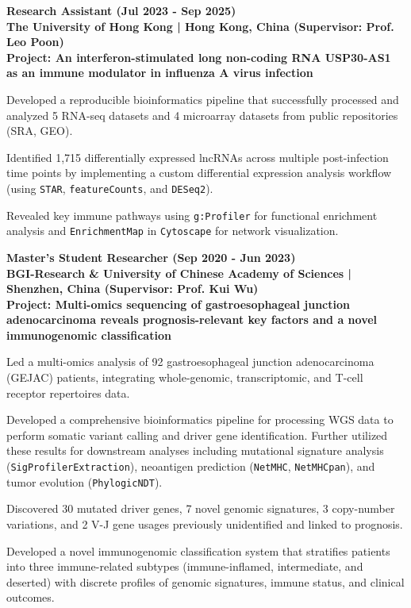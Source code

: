 \documentclass[11pt, a4paper]{awesome-cv}
\begin{document}
\begin{cvparagraph}
\textbf{Research Assistant (Jul 2023 - Sep 2025)}\\
\textbf{The University of Hong Kong | Hong Kong, China (Supervisor: Prof. Leo Poon)}\\
\textbf{Project: An interferon-stimulated long non-coding RNA USP30-AS1 as an immune modulator in influenza A virus infection}
\vspace{4.5mm}
\begin{cvitems}
  \item Developed a reproducible bioinformatics pipeline that successfully processed and analyzed 5 RNA-seq datasets and 4 microarray datasets from public repositories (SRA, GEO).
  \item Identified 1,715 differentially expressed lncRNAs across multiple post-infection time points by implementing a custom differential expression analysis workflow (using \texttt{STAR}, \texttt{featureCounts}, and \texttt{DESeq2}).
  \item Revealed key immune pathways using \texttt{g:Profiler} for functional enrichment analysis and \texttt{EnrichmentMap} in \texttt{Cytoscape} for network visualization.
\end{cvitems}

\vspace{4mm}
\textbf{Master's Student Researcher (Sep 2020 - Jun 2023)}\\
\textbf{BGI-Research \& University of Chinese Academy of Sciences | Shenzhen, China (Supervisor: Prof. Kui Wu)}\\
\textbf{Project: Multi-omics sequencing of gastroesophageal junction adenocarcinoma reveals prognosis-relevant key factors and a novel immunogenomic classification}
\vspace{4.5mm}
\begin{cvitems}
  \item Led a multi-omics analysis of 92 gastroesophageal junction adenocarcinoma (GEJAC) patients, integrating whole-genomic, transcriptomic, and T-cell receptor repertoires data.
  \item Developed a comprehensive bioinformatics pipeline for processing WGS data to perform somatic variant calling and driver gene identification. Further utilized these results for downstream analyses including mutational signature analysis (\texttt{SigProfilerExtraction}), neoantigen prediction (\texttt{NetMHC}, \texttt{NetMHCpan}), and tumor evolution (\texttt{PhylogicNDT}).
  \item Discovered 30 mutated driver genes, 7 novel genomic signatures, 3 copy-number variations, and 2 V-J gene usages previously unidentified and linked to prognosis.
  \item Developed a novel immunogenomic classification system that stratifies patients into three immune-related subtypes (immune-inflamed, intermediate, and deserted) with discrete profiles of genomic signatures, immune status, and clinical outcomes.
\end{cvitems}
\end{cvparagraph}
\end{document}
